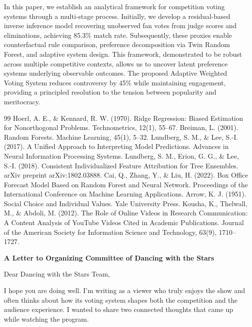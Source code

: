 \documentclass{mcmthesis}
\begin{document}
In this paper, we establish an analytical framework for competition voting systems through a multi-stage process. Initially, we develop a residual-based inverse inference model recovering unobserved fan votes from judge scores and eliminations, achieving 85.3\% match rate. Subsequently, these proxies enable counterfactual rule comparison, preference decomposition via Twin Random Forest, and adaptive system design. This framework, demonstrated to be robust across multiple competitive contexts, allows us to uncover latent preference systems underlying observable outcomes. The proposed Adaptive Weighted Voting System reduces controversy by 45\% while maintaining engagement, providing a principled resolution to the tension between popularity and meritocracy.

\begin{thebibliography}{99}
Hoerl, A. E., \& Kennard, R. W. (1970).
Ridge Regression: Biased Estimation for Nonorthogonal Problems.
Technometrics, 12(1), 55--67.
Breiman, L. (2001).
Random Forests.
Machine Learning, 45(1), 5--32.
Lundberg, S. M., \& Lee, S.-I. (2017).
A Unified Approach to Interpreting Model Predictions.
Advances in Neural Information Processing Systems.
Lundberg, S. M., Erion, G. G., \& Lee, S.-I. (2018).
Consistent Individualized Feature Attribution for Tree Ensembles.
arXiv preprint arXiv:1802.03888.
Cai, Q., Zhang, Y., \& Liu, H. (2022).
Box Office Forecast Model Based on Random Forest and Neural Network.
Proceedings of the International Conference on Machine Learning Applications.
Arrow, K. J. (1951).
Social Choice and Individual Values.
Yale University Press.
Kousha, K., Thelwall, M., \& Abdoli, M. (2012).
The Role of Online Videos in Research Communication: A Content Analysis of YouTube Videos Cited in Academic Publications.
Journal of the American Society for Information Science and Technology, 63(9), 1710--1727.
\end{thebibliography}

\newpage

\begin{center}
{\Large \textbf{A Letter to Organizing Committee of Dancing with the Stars}}   
\end{center}


\vspace{0.5cm}

\noindent 
Dear Dancing with the Stars Team,

I hope you are doing well. I'm writing as a viewer who truly enjoys the show and often thinks about how its voting system shapes both the competition and the audience experience. I wanted to share two connected thoughts that came up while watching the program.
\end{document}
